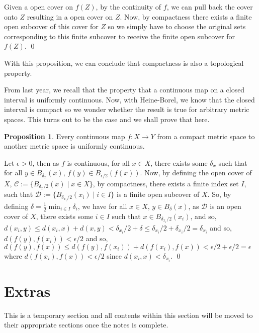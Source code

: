 \documentclass[
]{article}
\theoremstyle{definition}
\newtheorem{prop}{Proposition}
\theoremstyle{definition}
\begin{document}
Given a open cover on \(f(Z)\), by the continuity of \(f\), we can pull
back the cover onto \(Z\) resulting in a open cover on \(Z\). Now, by
compactness there exists a finite open subcover of this cover for \(Z\)
so we simply have to choose the original sets corresponding to this
finite subcover to receive the finite open subcover for \(f(Z)\). \qed

With this proposition, we can conclude that compactness is also a
topological property.

From last year, we recall that the property that a continuous map on a
closed interval is uniformly continuous. Now, with Heine-Borel, we know
that the closed interval is compact so we wonder whether the result is
true for arbitrary metric spaces. This turns out to be the case and we
shall prove that here.

\begin{prop}
  Every continuous map \(f : X \to Y\) from a compact metric space to another 
  metric space is uniformly continuous.
\end{prop}
\proof

Let \(\epsilon > 0\), then as \(f\) is continuous, for all \(x \in X\),
there exists some \(\delta_x\) such that for all
\(y \in B_{\delta_x}(x)\), \(f(y) \in B_{\epsilon / 2}(f(x))\). Now, by
defining the open cover of \(X\),
\(\mathcal{C} := \{B_{\delta_x / 2}(x) \mid x \in X\}\), by compactness,
there exists a finite index set \(I\), such that
\(\mathcal{D} :=  \{B_{\delta_{x_i} / 2}(x_i) \mid i \in I\}\) is a
finite open subcover of \(X\). So, by defining
\(\delta = \frac{1}{2} \min_{i \in I} \delta_i\), we have for all
\(x \in X\), \(y \in B_\delta(x)\), as \(\mathcal{D}\) is an open cover
of \(X\), there exists some \(i \in I\) such that
\(x \in B_{\delta_{x_i} / 2}(x_i)\), and so,
\(d(x_i, y) \le d(x_i, x) + d(x, y) < \delta_{x_i} / 2 + \delta \le  \delta_{x_i} / 2 + \delta_{x_i} / 2 = \delta_{x_i}\)
and so, \(d(f(y), f(x_i)) < \epsilon / 2\) and so,
\(d(f(y), f(x)) \le d(f(y), f(x_i)) +  d(f(x_i), f(x)) < \epsilon / 2 + \epsilon / 2 = \epsilon\)
where \(d(f(x_i), f(x)) < \epsilon / 2\) since
\(d(x_i, x) < \delta_{x_i}\). \qed

\newpage

\hypertarget{extras}{%
\section{Extras}\label{extras}}

This is a temporary section and all contents within this section will be
moved to their appropriate sections once the notes is complete.
\end{document}
